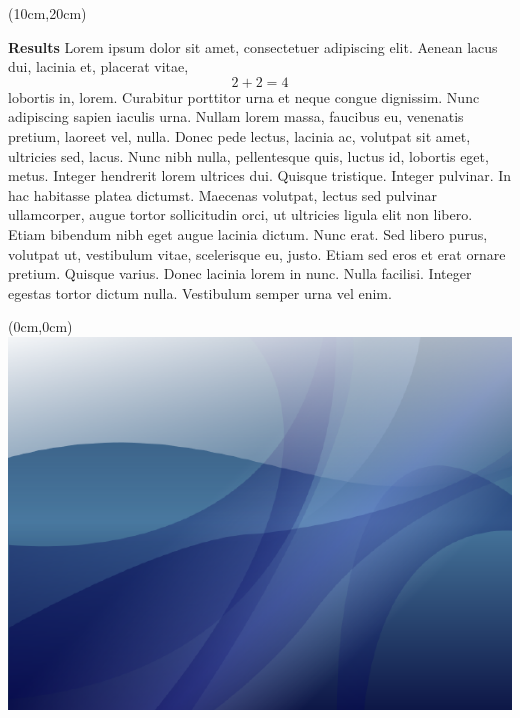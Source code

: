 \documentclass[oneside,final]{beamer}
\begin{document}
\begin{textblock*}{10cm}(10cm,20cm)\noindent%
\begin{beamerboxesrounded}[shadow=false,upper=block3up,lower=block3down]{\large\textbf{Results}}
Lorem ipsum dolor sit amet, consectetuer adipiscing elit. Aenean lacus dui, lacinia et, placerat vitae,
\begin{equation*}
2 + 2 = 4
\end{equation*}
lobortis in, lorem. Curabitur porttitor urna et neque congue dignissim. Nunc adipiscing sapien iaculis urna. Nullam lorem massa, faucibus eu, venenatis pretium, laoreet vel, nulla. Donec pede lectus, lacinia ac, volutpat sit amet, ultricies sed, lacus. Nunc nibh nulla, pellentesque quis, luctus id, lobortis eget, metus. Integer hendrerit lorem ultrices dui. Quisque tristique. Integer pulvinar. In hac habitasse platea dictumst. Maecenas volutpat, lectus sed pulvinar ullamcorper, augue tortor sollicitudin orci, ut ultricies ligula elit non libero. Etiam bibendum nibh eget augue lacinia dictum. Nunc erat. Sed libero purus, volutpat ut, vestibulum vitae, scelerisque eu, justo. Etiam sed eros et erat ornare pretium. Quisque varius. Donec lacinia lorem in nunc. Nulla facilisi. Integer egestas tortor dictum nulla. Vestibulum semper urna vel enim.
\end{beamerboxesrounded}
\end{textblock*}

\begin{textblock*}{0cm}(0cm,0cm)
\noindent%
\includegraphics[angle=90,width=\paperwidth,height=\paperheight]{background}
\end{textblock*}
\end{document}
